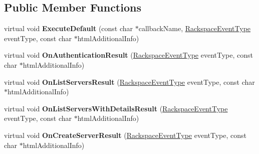 \subsection*{Public Member Functions}
\begin{DoxyCompactItemize}
\item 
\hypertarget{class_rak_net_1_1_rackspace_event_callback___default_ae411389c647c185cbcf7e36b7d77dac3}{virtual void {\bfseries Execute\-Default} (const char $\ast$callback\-Name, \hyperlink{namespace_rak_net_a120cf6e1a0904cff45269f14c3c4c289}{Rackspace\-Event\-Type} event\-Type, const char $\ast$html\-Additional\-Info)}\label{class_rak_net_1_1_rackspace_event_callback___default_ae411389c647c185cbcf7e36b7d77dac3}

\item 
\hypertarget{class_rak_net_1_1_rackspace_event_callback___default_a3df0b42428e4354291a91f3088c3f1e5}{virtual void {\bfseries On\-Authentication\-Result} (\hyperlink{namespace_rak_net_a120cf6e1a0904cff45269f14c3c4c289}{Rackspace\-Event\-Type} event\-Type, const char $\ast$html\-Additional\-Info)}\label{class_rak_net_1_1_rackspace_event_callback___default_a3df0b42428e4354291a91f3088c3f1e5}

\item 
\hypertarget{class_rak_net_1_1_rackspace_event_callback___default_af6472df20f791a77ab3904f1e15c155c}{virtual void {\bfseries On\-List\-Servers\-Result} (\hyperlink{namespace_rak_net_a120cf6e1a0904cff45269f14c3c4c289}{Rackspace\-Event\-Type} event\-Type, const char $\ast$html\-Additional\-Info)}\label{class_rak_net_1_1_rackspace_event_callback___default_af6472df20f791a77ab3904f1e15c155c}

\item 
\hypertarget{class_rak_net_1_1_rackspace_event_callback___default_a46e38dc12b634a845208af890b1fd435}{virtual void {\bfseries On\-List\-Servers\-With\-Details\-Result} (\hyperlink{namespace_rak_net_a120cf6e1a0904cff45269f14c3c4c289}{Rackspace\-Event\-Type} event\-Type, const char $\ast$html\-Additional\-Info)}\label{class_rak_net_1_1_rackspace_event_callback___default_a46e38dc12b634a845208af890b1fd435}

\item 
\hypertarget{class_rak_net_1_1_rackspace_event_callback___default_a00c4d1e26496422ae8e950261bd06d0e}{virtual void {\bfseries On\-Create\-Server\-Result} (\hyperlink{namespace_rak_net_a120cf6e1a0904cff45269f14c3c4c289}{Rackspace\-Event\-Type} event\-Type, const char $\ast$html\-Additional\-Info)}\label{class_rak_net_1_1_rackspace_event_callback___default_a00c4d1e26496422ae8e950261bd06d0e}


\end{DoxyCompactItemize}
